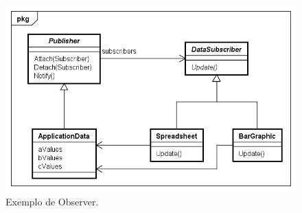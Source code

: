 \begin{figure}[htb]
	\caption{\label{observer_exemplo}Exemplo de Observer.}
	\begin{center}
	    \includegraphics[scale=0.5]{5_padroes-contexto-funcional/5.3_comportamentais/5.3.07_observer/observer_exemplo.png}
	\end{center}
\end{figure}

